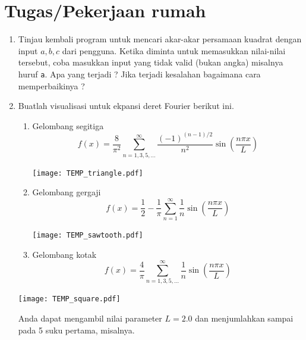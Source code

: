 \documentclass[a4paper,11pt]{extarticle}
\begin{document}
\section{Tugas/Pekerjaan rumah}

\begin{enumerate}
\item Tinjau kembali program untuk mencari akar-akar persamaan kuadrat dengan input
$a, b, c$ dari pengguna. Ketika diminta untuk memasukkan nilai-nilai tersebut,
coba masukkan input yang tidak valid (bukan angka) misalnya huruf \texttt{a}.
Apa yang terjadi ?
Jika terjadi kesalahan bagaimana cara memperbaikinya ?
%
\item Buatlah visualisasi untuk ekpansi deret Fourier berikut ini.
  \begin{enumerate}
  \item Gelombang segitiga
  \begin{equation}
  f(x) = \frac{8}{\pi^2} \sum_{n=1,3,5,\ldots}^{\infty}
  \frac{(-1)^{(n-1)/2}}{n^2}\sin\left( \frac{n\pi x}{L} \right)
  \end{equation}
  {\centering
  \texttt{[image: TEMP\_triangle.pdf]}
  \par}
  \item Gelombang gergaji
  \begin{equation}
  f(x) = \frac{1}{2} - \frac{1}{\pi}\sum_{n=1}^{\infty}
  \frac{1}{n}\sin\left( \frac{n\pi x}{L} \right)
  \end{equation}
  {\centering
  \texttt{[image: TEMP\_sawtooth.pdf]}
  \par}
  \item Gelombang kotak
  \begin{equation}
  f(x) = \frac{4}{\pi}\sum_{n=1,3,5,\ldots}^{\infty}
  \frac{1}{n} \sin\left( \frac{n\pi x}{L} \right)
  \end{equation}
  \end{enumerate}
  {\centering
  \texttt{[image: TEMP\_square.pdf]}
  \par}
  Anda dapat mengambil nilai parameter $L = 2.0$ dan
  menjumlahkan sampai pada 5 suku pertama, misalnya.
%
\end{enumerate}
\end{document}
